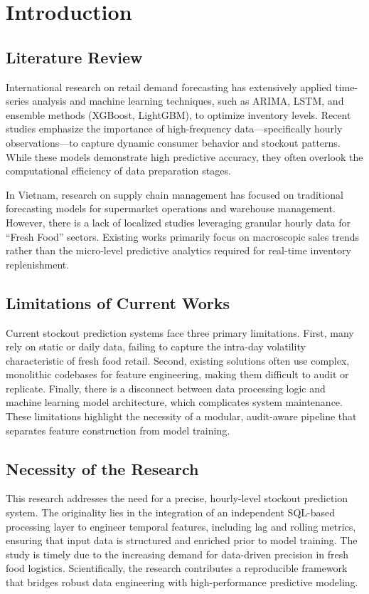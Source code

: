 \documentclass[11pt]{article}
\begin{document}
\section{Introduction}

\subsection{Literature Review}

International research on retail demand forecasting has extensively applied time-series analysis and machine learning techniques, such as ARIMA, LSTM, and ensemble methods (XGBoost, LightGBM), to optimize inventory levels. Recent studies emphasize the importance of high-frequency data---specifically hourly observations---to capture dynamic consumer behavior and stockout patterns. While these models demonstrate high predictive accuracy, they often overlook the computational efficiency of data preparation stages.

In Vietnam, research on supply chain management has focused on traditional forecasting models for supermarket operations and warehouse management. However, there is a lack of localized studies leveraging granular hourly data for ``Fresh Food'' sectors. Existing works primarily focus on macroscopic sales trends rather than the micro-level predictive analytics required for real-time inventory replenishment.

\subsection{Limitations of Current Works}

Current stockout prediction systems face three primary limitations. First, many rely on static or daily data, failing to capture the intra-day volatility characteristic of fresh food retail. Second, existing solutions often use complex, monolithic codebases for feature engineering, making them difficult to audit or replicate. Finally, there is a disconnect between data processing logic and machine learning model architecture, which complicates system maintenance. These limitations highlight the necessity of a modular, audit-aware pipeline that separates feature construction from model training.

\subsection{Necessity of the Research}

This research addresses the need for a precise, hourly-level stockout prediction system. The originality lies in the integration of an independent SQL-based processing layer to engineer temporal features, including lag and rolling metrics, ensuring that input data is structured and enriched prior to model training. The study is timely due to the increasing demand for data-driven precision in fresh food logistics. Scientifically, the research contributes a reproducible framework that bridges robust data engineering with high-performance predictive modeling.
\end{document}
